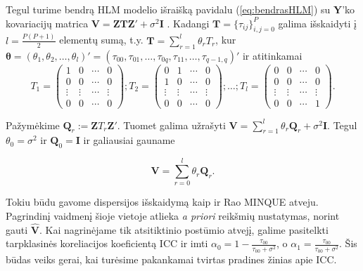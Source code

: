 \documentclass[12pt,a4paper]{article}
\begin{document}
Tegul turime bendrą HLM modelio išraišką pavidalu (\ref{eq:bendrasHLM}) su $\mathbf{Y}$'ko kovariacijų matrica $\mathbf{V}=\mathbf{ZTZ'}+\sigma^2\mathbf{I}$ . Kadangi $\mathbf{T}=\{\tau_{ij}\}^P_{i,j=0}$ galima išskaidyti į $l=\frac{P(P+1)}{2}$ elementų sumą, t.y.
$\mathbf{T}=\sum^l_{r=1}\theta_rT_r$, kur $\boldsymbol{\theta} = (\theta_1,\theta_2,\dots,\theta_l)'=(\tau_{00}, \tau_{01}, \dots, \tau_{0q}, \tau_{11},\dots, \tau_{q-1,q})'$ ir atitinkamai
\small
\[
T_1=
\begin{pmatrix}
1&0&\cdots&0 \\
0&0&\cdots&0 \\
\vdots&\vdots& \cdots &\vdots \\
0&0&\cdots&0
\end{pmatrix};
T_2=
\begin{pmatrix}
0&1&\cdots&0 \\
1&0&\cdots&0 \\
\vdots&\vdots& \cdots &\vdots \\
0&0&\cdots&0
\end{pmatrix};
\dots;
T_l=
\begin{pmatrix}
0&0&\cdots&0 \\
0&0&\cdots&0 \\
\vdots&\vdots& \cdots &\vdots \\
0&0&\cdots&1
\end{pmatrix}.
\]

Pažymėkime $\mathbf{Q}_r:= \mathbf{Z}T_r\mathbf{Z'}$. Tuomet galima užrašyti $\mathbf{V}=\sum^l_{r=1}\theta_r\mathbf{Q}_r+\sigma^2 \mathbf{I}$. Tegul $\theta_0 = \sigma^2$ ir $\mathbf{Q}_0=\mathbf{I}$ ir galiausiai gauname

\begin{equation}
\mathbf{V}=\sum^l_{r=0} \theta_r\mathbf{Q}_r.
\end{equation}

Tokiu būdu gavome dispersijos išskaidymą kaip ir Rao MINQUE atveju. Pagrindinį vaidmenį šioje vietoje atlieka \textit{a priori} reikšmių nustatymas, norint gauti $\mathbf{\hat{V}}$. Kai nagrinėjame tik atsitiktinio postūmio atvejį, galime pasitelkti tarpklasinės koreliacijos koeficientą ICC ir imti $\alpha_0=1-\frac{\tau_{00}}{\tau_{00}+\sigma^2}$, o $\alpha_1=\frac{\tau_{00}}{\tau_{00}+\sigma^2}$. Šis būdas veiks gerai, kai turėsime pakankamai tvirtas pradines žinias apie ICC.\cite{delpish}
\end{document}
